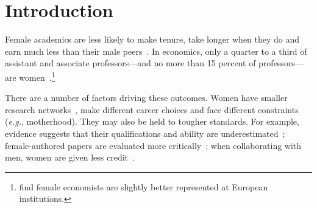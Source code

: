 
\def\myshorttitle{Publishing while female}
\def\mysubtitle{Are women held to higher standards? Evidence from peer review.}
\def\myauthor{Erin Hengel}
\def\mydate{August 2021}
\def\orgdate{(First version: September 2015)}
\def\address{Chatham Street, Liverpool L69 7ZH, U.K.}
\def\telephone{+44 (0)7 824 863 784}
\def\affiliation{University of Liverpool}
\def\department{Department of Economics}
\def\position{Lecturer in Economics}
\def\email{erin.hengel@gmail.com}
\def\thanksbitches{This paper is a revised version of the third chapter of my dissertation (University of Cambridge, September 2015). I am grateful to my supervisor Christopher Harris for (a) excellent guidance and (b) thinking this was a good idea. I am similarly indebted to Jeremy Edwards and my examination committee (Leonardo Felli and Hamish Low) for considerable input and advice. I also thank Miguel Almunia, Carolina Alves, Oriana Bandiera, Anne Boring, Cheryl Carleton, Gary Cook, Dominique Demougin, Harris Dellas, Carola Frege, Claudia Goldin, Olga Gorelkina, Jane Hunt, Ali Ismail, Adam Jaffe, Katya Kartashova, John Leahy, Brendan McCabe, Reshef Meir, Imran Rasul, Ludovic Renou, Kevin Schnepel, Joel Sobel, Heidi Williams, Jarrod Zhang, numerous anonymous referees and editors, and participants at many seminars, workshops and conferences. Finally, this paper could not have been written without substantial, careful research assistance by Michael Hengel (my dad), Eileen Hengel (my sister) and Lunna Ai (my actual research assistant). All errors, of course, are mine.}
\def\keywords{gender, readability, discrimination, bias, academic publishing}
\def\subject{Gender bias}
\def\jel{A11, J16, J24}
\def\wordcount{20,300}


\section{Introduction}
\label{introduction}

Female academics are less likely to make tenure, take longer when they do and earn much less than their male peers~\citep{Bandiera2016,Ceci2014,Ginther2004,Weisshaar2017}. In economics, only a quarter to a third of assistant and associate professors---and no more than 15 percent of professors---are women~\citep{Lundberg2019,Gamage2020,Bateman2021}.\footnote{\citet{Auriol2019} find female economists are slightly better represented at European institutions.}

There are a number of factors driving these outcomes. Women have smaller research networks~\citep{Ductor2018}, make different career choices and face different constraints (\emph{e.g.}, motherhood). They may also be held to tougher standards. For example, evidence suggests that their qualifications and ability are underestimated~\citep{Foschi1996,Grunspan2016,Moss-Racusin2012,Reuben2014}; female-authored papers are evaluated more critically~\citep{Goldberg1968,Krawczyk2016,Paludi1983}; when collaborating with men, women are given less credit~\citep{Heilman2005,Sarsons2020}.

